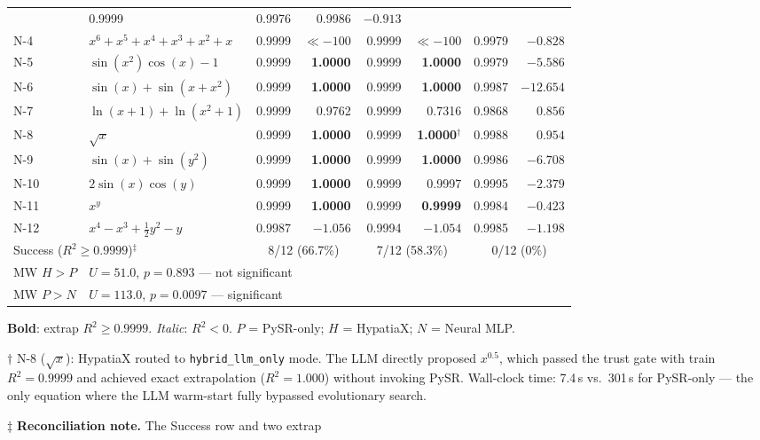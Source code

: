 \documentclass[twoside,11pt]{article}
\newcommand{\Rsq}{R^{2}}
\begin{document}
\begin{table}[h]
\begin{threeparttable}
\begin{tabular}{llrrrrrr}
  & 0.9999 & 0.9976
  & 0.9986 & $-0.913$ \\
N-4  & $x^6 + x^5 + x^4 + x^3 + x^2 + x$
  & 0.9999 & \emph{$\ll{-}100$}
  & 0.9999 & \emph{$\ll{-}100$}
  & 0.9979 & $-0.828$ \\
N-5  & $\sin(x^2)\cos(x)-1$
  & 0.9999 & \textbf{1.0000}
  & 0.9999 & \textbf{1.0000}
  & 0.9979 & $-5.586$ \\
N-6  & $\sin(x)+\sin(x+x^2)$
  & 0.9999 & \textbf{1.0000}
  & 0.9999 & \textbf{1.0000}
  & 0.9987 & $-12.654$ \\
N-7  & $\ln(x+1)+\ln(x^2+1)$
  & 0.9999 & 0.9762
  & 0.9999 & 0.7316
  & 0.9868 & $0.856$ \\
N-8  & $\sqrt{x}$
  & 0.9999 & \textbf{1.0000}
  & 0.9999 & \textbf{1.0000}$^\dag$
  & 0.9988 & $0.954$ \\
N-9  & $\sin(x)+\sin(y^2)$
  & 0.9999 & \textbf{1.0000}
  & 0.9999 & \textbf{1.0000}
  & 0.9986 & $-6.708$ \\
N-10 & $2\sin(x)\cos(y)$
  & 0.9999 & \textbf{1.0000}
  & 0.9999 & 0.9997
  & 0.9995 & $-2.379$ \\
N-11 & $x^y$
  & 0.9999 & \textbf{1.0000}
  & 0.9999 & \textbf{0.9999}
  & 0.9984 & $-0.423$ \\
N-12 & $x^4 - x^3 + \tfrac{1}{2}y^2 - y$
  & 0.9987 & $-1.056$
  & 0.9994 & $-1.054$
  & 0.9985 & $-1.198$ \\
\midrule
\multicolumn{2}{l}{Success ($\Rsq\ge0.9999$)$^\ddag$}
  & \multicolumn{2}{c}{8/12 (66.7\%)}
  & \multicolumn{2}{c}{7/12 (58.3\%)}
  & \multicolumn{2}{c}{0/12 (0\%)} \\
MW $H>P$   & \multicolumn{7}{l}{$U=51.0$, $p=0.893$ — not significant} \\
MW $P>N$   & \multicolumn{7}{l}{$U=113.0$, $p=0.0097$ — significant} \\
\bottomrule
\end{tabular}
\begin{tablenotes}\small
  \item \textbf{Bold}: extrap $\Rsq \ge 0.9999$. \emph{Italic}: $\Rsq < 0$.
    $P$ = PySR-only; $H$ = HypatiaX; $N$ = Neural MLP.
  \item[$\dag$] N-8 ($\sqrt{x}$): HypatiaX routed to \texttt{hybrid\_llm\_only} mode.
    The LLM directly proposed $x^{0.5}$, which passed the trust gate with
    train $\Rsq = 0.9999$ and achieved exact extrapolation ($\Rsq = 1.000$)
    without invoking PySR. Wall-clock time: 7.4\,s vs.\ 301\,s for PySR-only ---
    the only equation where the LLM warm-start fully bypassed evolutionary search.
  \item[$\ddag$] \textbf{Reconciliation note.} The Success row and two extrap

\end{tablenotes}
\end{threeparttable}
\end{table}
\end{document}
